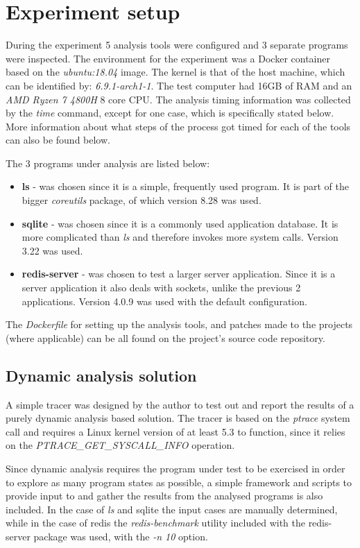 \section{Experiment setup}
\label{sec:setup}
During the experiment 5 analysis tools were configured and 3 separate programs were inspected.
The environment for the experiment was a Docker container based on the \textit{ubuntu:18.04} image.
The kernel is that of the host machine, which can be identified by: \textit{6.9.1-arch1-1}.
The test computer had 16GB of RAM and an \textit{AMD Ryzen 7 4800H} 8 core CPU.
The analysis timing information was collected by the \textit{time} command, except for one case, which is specifically stated below. More information about what steps of the process got timed for each of the tools can also be found below.

The 3 programs under analysis are listed below:
\begin{itemize}
    \item {\textbf{ls} - was chosen since it is a simple, frequently used program. It is part of the bigger \textit{coreutils} package, of which version 8.28 was used.}
    \item {\textbf{sqlite} - was chosen since it is a commonly used application database. It is more complicated than \textit{ls} and therefore invokes more system calls. Version 3.22 was used.}
    \item {\textbf{redis-server} - was chosen to test a larger server application. Since it is a server application it also deals with sockets, unlike the previous 2 applications. Version 4.0.9 was used with the default configuration.}
\end{itemize}

The \textit{Dockerfile} for setting up the analysis tools, and patches made to the projects (where applicable) can be all found on the project's source code repository.

\subsection {Dynamic analysis solution}
A simple tracer was designed by the author to test out and report the results of a purely dynamic analysis based solution.
The tracer is based on the \textit{ptrace} system call and requires a Linux kernel version of at least 5.3 to function, since it relies on the \textit{PTRACE\_GET\_SYSCALL\_INFO} operation.

Since dynamic analysis requires the program under test to be exercised in order to explore as many program states as possible, a simple framework and scripts to provide input to and gather the results from the analysed programs is also included. In the case of \textit{ls} and sqlite the input cases are manually determined, while in the case of redis the \textit{redis-benchmark} utility included with the redis-server package was used, with the \textit{-n 10} option.


